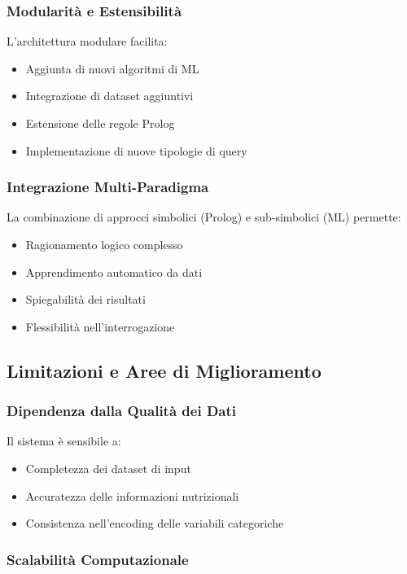 \documentclass[12pt,a4paper]{article}
\begin{document}
\subsubsection{Modularità e Estensibilità}

L'architettura modulare facilita:
\begin{itemize}
    \item Aggiunta di nuovi algoritmi di ML
    \item Integrazione di dataset aggiuntivi
    \item Estensione delle regole Prolog
    \item Implementazione di nuove tipologie di query
\end{itemize}

\subsubsection{Integrazione Multi-Paradigma}

La combinazione di approcci simbolici (Prolog) e sub-simbolici (ML) permette:
\begin{itemize}
    \item Ragionamento logico complesso
    \item Apprendimento automatico da dati
    \item Spiegabilità dei risultati
    \item Flessibilità nell'interrogazione
\end{itemize}

\subsection{Limitazioni e Aree di Miglioramento}

\subsubsection{Dipendenza dalla Qualità dei Dati}

Il sistema è sensibile a:
\begin{itemize}
    \item Completezza dei dataset di input
    \item Accuratezza delle informazioni nutrizionali
    \item Consistenza nell'encoding delle variabili categoriche
\end{itemize}

\subsubsection{Scalabilità Computazionale}
\end{document}
